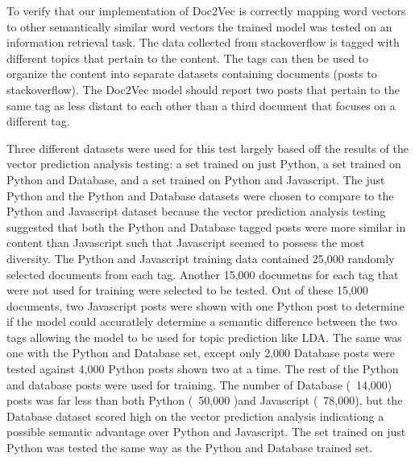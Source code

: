 To verify that our implementation of Doc2Vec is correctly mapping word vectors to other semantically similar word vectors the trained model was tested on an information retrieval task. The data collected from stackoverflow is tagged with different topics that pertain to the content. The tags can then be used to organize the content into separate datasets containing documents (posts to stackoverflow). The Doc2Vec model should report two posts that pertain to the same tag as less distant to each other than a third document that focuses on a different tag.

Three different datasets were used for this test largely based off the results of the vector prediction analysis testing: a set trained on just Python, a set trained on Python and Database, and a set trained on Python and Javascript. The just Python and the Python and Database datasets were chosen to compare to the Python and Javascript dataset because the vector prediction analysis testing suggested that both the Python and Database tagged posts were more similar in content than Javascript such that Javascript seemed to possess the most diversity. The Python and Javascript training data contained 25,000 randomly selected documents from each tag. Another 15,000 documetns for each tag that were not used for training were selected to be tested. Out of these 15,000 documents, two Javascript posts were shown with one Python post to determine if the model could accuratlely determine a semantic difference between the two tags allowing the model to be used for topic prediction like LDA. The same was one with the Python and Database set, except only 2,000 Database posts were tested against 4,000 Python posts shown two at a time. The rest of the Python and database posts were used for training. The number of Database (~14,000) posts was far less than both Python (~50,000 )and Javascript (~78,000), but the Database dataset scored high on the vector prediction analysis indicationg a possible semantic advantage over Python and Javascript. The set trained on just Python was tested the same way as the Python and Database trained set.

